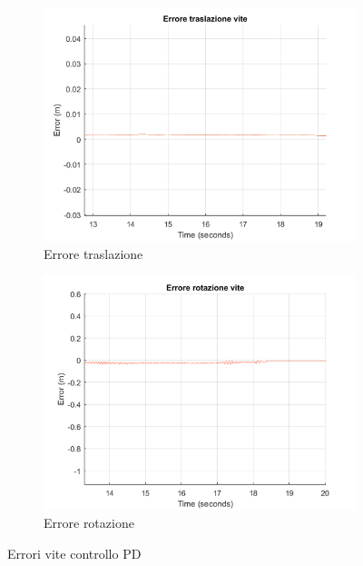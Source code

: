 \begin{figure}
	\begin{subfigure}{.5\textwidth}
		\includegraphics[width=.8\linewidth]{Immagini/Traiettorie/ErroreTrasVite}  
		\caption{Errore traslazione}
		\label{fig:sub-ert}
	\end{subfigure}
	\begin{subfigure}{.5\textwidth}
		\includegraphics[width=.8\linewidth]{Immagini/Traiettorie/ErroreRotVite}  
		\caption{Errore rotazione}
		\label{fig:sub-err}
	\end{subfigure}
	\caption{Errori vite controllo PD}
	\label{fig:ErrVite}
\end{figure}
